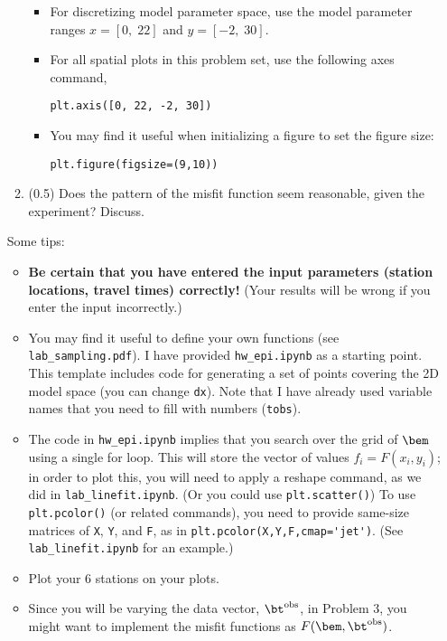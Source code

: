 \documentclass[11pt,titlepage,fleqn]{article}
\begin{document}
\begin{enumerate}
\begin{enumerate}
\begin{itemize}
\item For discretizing model parameter space, use the model parameter ranges $x = [0,\;22]$ and $y = [-2,\;30]$.
\item For all spatial plots in this problem set, use the following axes command,

\verb+plt.axis([0, 22, -2, 30])+

\item You may find it useful when initializing a figure to set the figure size:

\verb+plt.figure(figsize=(9,10))+
\end{itemize}

\item (0.5) Does the pattern of the misfit function seem reasonable, given the experiment? Discuss.
\end{enumerate}

Some tips:
%
\begin{itemize}
\item {\bf Be certain that you have entered the input parameters (\eg station locations, travel times) correctly!} (Your results will be wrong if you enter the input incorrectly.)

\item You may find it useful to define your own functions (see \verb+lab_sampling.pdf+). I have provided \verb+hw_epi.ipynb+ as a starting point. This template includes code for generating a set of points covering the 2D model space (you can change \verb+dx+). Note that I have already used variable names that you need to fill with numbers (\eg \verb+tobs+).

\item The code in \verb+hw_epi.ipynb+ implies that you search over the grid of $\bem$ using a single for loop. This will store the vector of values $f_i = F(x_i,y_i)$; in order to plot this, you will need to apply a reshape command, as we did in \verb+lab_linefit.ipynb+. (Or you could use \verb+plt.scatter()+) To use \verb+plt.pcolor()+ (or related commands), you need to provide same-size matrices of \verb+X+, \verb+Y+, and \verb+F+, as in \verb+plt.pcolor(X,Y,F,cmap='jet')+. (See \verb+lab_linefit.ipynb+ for an example.)

\item Plot your 6 stations on your plots. 

\item Since you will be varying the data vector, $\bt^{\rm obs}$, in Problem 3, you might want to implement the misfit functions as $F(\bem,\bt^{\rm obs})$.

\end{itemize}

\end{enumerate}
\end{document}

